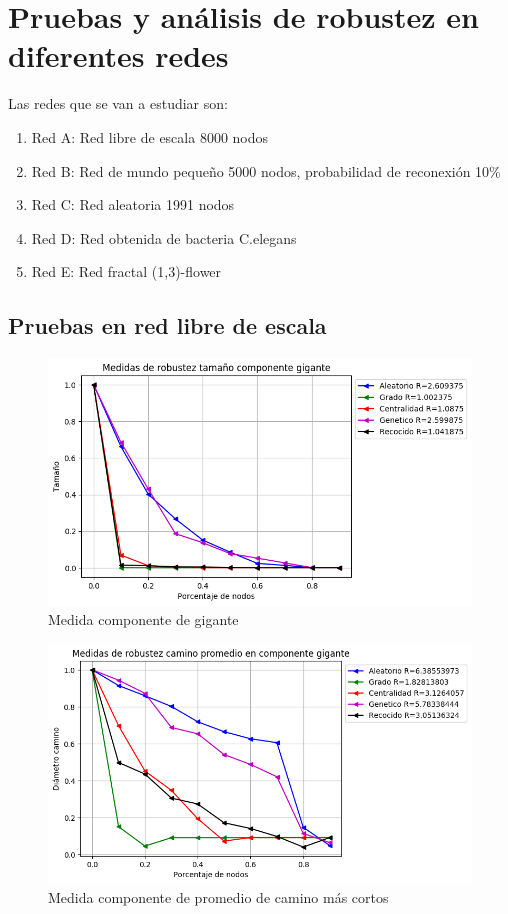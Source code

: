 \section{Pruebas y análisis de robustez en diferentes redes}

Las redes que se van a estudiar son:

\begin{enumerate}
    \item Red A: Red libre de escala 8000 nodos
    \item Red B: Red de mundo pequeño 5000 nodos, probabilidad de reconexión 10\%
    \item Red C: Red aleatoria 1991 nodos
    \item Red D: Red obtenida de bacteria C.elegans
    \item Red E: Red fractal (1,3)-flower
\end{enumerate}

\subsection{Pruebas en red libre de escala}

\begin{figure}[H]
    \centering
    \includegraphics[scale=0.7]{Capitulo5Robustez/imagenes/grafica_GC20180512_143117ScaleFree8000Nodes.png}
    \caption{Medida componente de gigante}
\end{figure}


\begin{figure}[H]
    \centering
    \includegraphics[scale=0.7]{Capitulo5Robustez/imagenes/grafica_APL20180512_143117ScaleFree8000Nodes.png}
    \caption{Medida componente de promedio de camino más cortos}
\end{figure}

